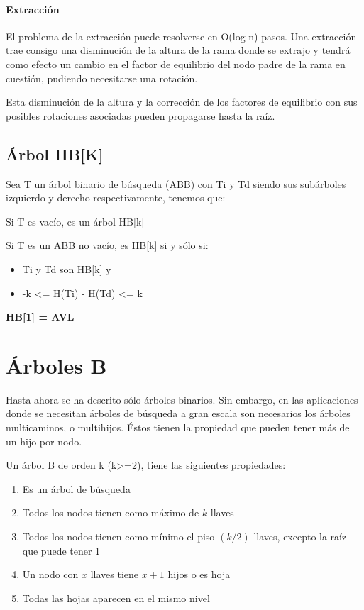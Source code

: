 \paragraph{ Extracción}
\label{sec:extraccion}

El problema de la extracción puede resolverse en O(log n) pasos. Una
extracción trae consigo una disminución de la altura de la rama donde
se extrajo y tendrá como efecto un cambio en el factor de equilibrio
del nodo padre de la rama en cuestión, pudiendo necesitarse una
rotación.

Esta disminución de la altura y la corrección de los factores de
equilibrio con sus posibles rotaciones asociadas pueden propagarse
hasta la raíz.

\subsection{Árbol HB[K]}
\label{sec:arbol-hbk}
Sea T un árbol binario de búsqueda (ABB) con Ti y Td siendo sus
subárboles izquierdo y derecho respectivamente, tenemos que:


Si T es vacío, es un árbol HB[k]

Si T es un ABB no vacío, es HB[k] si y sólo si:

\begin{itemize}
\item Ti y Td son HB[k] y
\item -k <= H(Ti) - H(Td) <= k
\end{itemize}

\textbf{HB[1] = AVL }

\section{Árboles B}
\label{sec:arboles-b}

Hasta ahora se ha descrito sólo árboles binarios. Sin embargo, en las
aplicaciones donde se necesitan árboles de búsqueda a gran escala son
necesarios los árboles multicaminos, o multihijos. Éstos tienen la
propiedad que pueden tener más de un hijo por nodo.

Un árbol B de orden k (k>=2), tiene las siguientes propiedades:

\begin{enumerate}
\item Es un árbol de búsqueda
\item Todos los nodos tienen como máximo de $k$ llaves
\item Todos los nodos tienen como mínimo el piso $(k/2)$ llaves,
  excepto la raíz que puede tener 1
\item Un nodo con $x$ llaves tiene $x+1$ hijos o es hoja
\item Todas las hojas aparecen en el mismo nivel
\end{enumerate}

